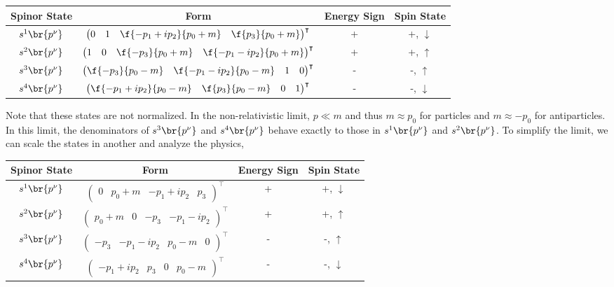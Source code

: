 \documentclass{article}
\begin{document}
\begin{center}
\begin{tabular}{|c|c|c|c|}
    \hline
    Spinor State & Form & Energy Sign & Spin State \\
    \hline
    $s^{1}\br{p^{\nu}}$ & $\begin{pmatrix} 0 & 1 & \f{-p_1 + i p_2}{p_0 + m} & \f{p_3}{p_0 + m} \end{pmatrix}^{\intercal}$ & + & +, $\downarrow$\\
    $s^{2}\br{p^{\nu}}$ & $\begin{pmatrix} 1 & 0 & \f{-p_3}{p_0 + m} & \f{-p_1 - i p_2}{p_0 + m} \end{pmatrix}^{\intercal}$ & + & +, $\uparrow$\\
    $s^{3}\br{p^{\nu}}$ & $\begin{pmatrix} \f{-p_3}{p_0 - m} & \f{-p_1 - i p_2}{p_0 - m} & 1 & 0 \end{pmatrix}^{\intercal}$ & - & -, $\uparrow$\\
    $s^{4}\br{p^{\nu}}$ & $\begin{pmatrix} \f{-p_1 + i p_2}{p_0 - m} & \f{p_3}{p_0 - m} & 0 & 1 \end{pmatrix}^{\intercal}$ & - & -, $\downarrow$\\
    \hline
\end{tabular}
\end{center}
Note that these states are not normalized.
In the non-relativistic limit, $p \ll m$ and thus $m \approx p_0$ for particles and $m \approx - p_0$ for antiparticles. In this limit, the denominators of $s^{3}\br{p^{\nu}}$ and $s^{4}\br{p^{\nu}}$ behave exactly to those in $s^{1}\br{p^{\nu}}$ and $s^{2}\br{p^{\nu}}$. To simplify the limit, we can scale the states in another and analyze the physics,
\begin{center}
\begin{tabular}{|c|c|c|c|}
    \hline
    Spinor State & Form & Energy Sign & Spin State \\
    \hline
    $s^{1}\br{p^{\nu}}$ & $\begin{pmatrix} 0 & {p_0 + m} & {-p_1 + i p_2} & {p_3} \end{pmatrix}^{\intercal}$ & + & +, $\downarrow$\\
    $s^{2}\br{p^{\nu}}$ & $\begin{pmatrix} {p_0 + m} & 0 & {-p_3} & {-p_1 - i p_2} \end{pmatrix}^{\intercal}$ & + & +, $\uparrow$\\
    $s^{3}\br{p^{\nu}}$ & $\begin{pmatrix} {-p_3} & {-p_1 - i p_2} & {p_0 - m} & 0 \end{pmatrix}^{\intercal}$ & - & -, $\uparrow$\\
    $s^{4}\br{p^{\nu}}$ & $\begin{pmatrix} {-p_1 + i p_2} & {p_3} & 0 & {p_0 - m} \end{pmatrix}^{\intercal}$ & - & -, $\downarrow$\\
    \hline
\end{tabular}
\end{center}
\end{document}
